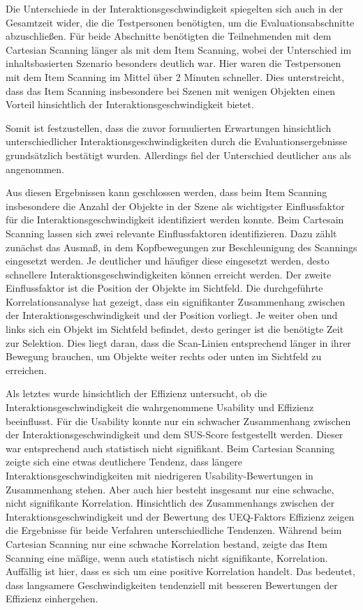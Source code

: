 Die Unterschiede in der Interaktionsgeschwindigkeit spiegelten sich auch in der Gesamtzeit wider, die die Testpersonen benötigten, um die Evaluationsabschnitte abzuschließen. Für beide Abschnitte benötigten die Teilnehmenden mit dem Cartesian Scanning länger als mit dem Item Scanning, wobei der Unterschied im inhaltsbasierten Szenario besonders deutlich war. Hier waren die Testpersonen mit dem Item Scanning im Mittel über 2 Minuten schneller. Dies unterstreicht, dass das Item Scanning insbesondere bei Szenen mit wenigen Objekten einen Vorteil hinsichtlich der Interaktionsgeschwindigkeit bietet.

Somit ist festzustellen, dass die zuvor formulierten Erwartungen hinsichtlich unterschiedlicher Interaktionsgeschwindigkeiten durch die Evaluationsergebnisse grundsätzlich bestätigt wurden. Allerdings fiel der Unterschied deutlicher aus als angenommen. 

Aus diesen Ergebnissen kann geschlossen werden, dass beim Item Scanning insbesondere die Anzahl der Objekte in der Szene als wichtigster Einflussfaktor für die Interaktionsgeschwindigkeit identifiziert werden konnte. Beim Cartesain Scanning lassen sich zwei relevante Einflussfaktoren identifizieren. Dazu zählt zunächst das Ausmaß, in dem Kopfbewegungen zur Beschleunigung des Scannings eingesetzt werden. Je deutlicher und häufiger diese eingesetzt werden, desto schnellere Interaktionsgeschwindigkeiten können erreicht werden. Der zweite Einflussfaktor ist die Position der Objekte im Sichtfeld. Die durchgeführte Korrelationsanalyse hat gezeigt, dass ein signifikanter Zusammenhang zwischen der Interaktionsgeschwindigkeit und der Position vorliegt. Je weiter oben und links sich ein Objekt im Sichtfeld befindet, desto geringer ist die benötigte Zeit zur Selektion. Dies liegt daran, dass die Scan-Linien entsprechend länger in ihrer Bewegung brauchen, um Objekte weiter rechts oder unten im Sichtfeld zu erreichen. 

Als letztes wurde hinsichtlich der Effizienz untersucht, ob die Interaktionsgeschwindigkeit die wahrgenommene Usability und Effizienz beeinflusst. Für die Usability konnte nur ein schwacher Zusammenhang zwischen der Interaktionsgeschwindigkeit und dem SUS-Score festgestellt werden. Dieser war entsprechend auch statistisch nicht signifikant. Beim Cartesian Scanning zeigte sich eine etwas deutlichere Tendenz, dass längere Interaktionsgeschwindigkeiten mit niedrigeren Usability-Bewertungen in Zusammenhang stehen. Aber auch hier besteht insgesamt nur eine schwache, nicht signifikante Korrelation. 
Hinsichtlich des Zusammenhangs zwischen der Interaktionsgeschwindigkeit und der Bewertung des UEQ-Faktors Effizienz zeigen die Ergebnisse für beide Verfahren unterschiedliche Tendenzen. Während beim Cartesian Scanning nur eine schwache Korrelation bestand, zeigte das Item Scanning eine mäßige, wenn auch statistisch nicht signifikante, Korrelation. Auffällig ist hier, dass es sich um eine positive Korrelation handelt. Das bedeutet, dass langsamere Geschwindigkeiten tendenziell mit besseren Bewertungen der Effizienz einhergehen. %

